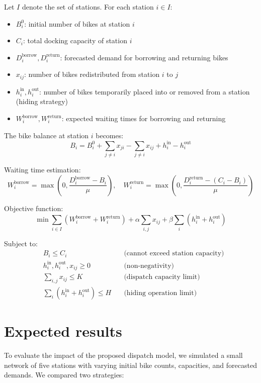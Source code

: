\documentclass[11pt,a4paper]{article}
\begin{document}
Let $I$ denote the set of stations. For each station $i \in I$:

\begin{itemize}
    \item $B_i^0$: initial number of bikes at station $i$
    \item $C_i$: total docking capacity of station $i$
    \item $D_i^{\text{borrow}}, D_i^{\text{return}}$: forecasted demand for borrowing and returning bikes
    \item $x_{ij}$: number of bikes redistributed from station $i$ to $j$
    \item $h_i^{\text{in}}, h_i^{\text{out}}$: number of bikes temporarily placed into or removed from a station (hiding strategy)
    \item $W_i^{\text{borrow}}, W_i^{\text{return}}$: expected waiting times for borrowing and returning
\end{itemize}

The bike balance at station $i$ becomes:
\[
B_i = B_i^0 + \sum_{j \ne i} x_{ji} - \sum_{j \ne i} x_{ij} + h_i^{\text{in}} - h_i^{\text{out}}
\]

Waiting time estimation:
\[
W_i^{\text{borrow}} = \max\left(0, \frac{D_i^{\text{borrow}} - B_i}{\mu}\right), \quad
W_i^{\text{return}} = \max\left(0, \frac{D_i^{\text{return}} - (C_i - B_i)}{\mu}\right)
\]

Objective function:
\[
\min \sum_{i \in I} \left( W_i^{\text{borrow}} + W_i^{\text{return}} \right) + \alpha \sum_{i,j} x_{ij} + \beta \sum_{i} \left( h_i^{\text{in}} + h_i^{\text{out}} \right)
\]

Subject to:
\begin{align*}
& B_i \leq C_i \quad &\text{(cannot exceed station capacity)} \\
& h_i^{\text{in}}, h_i^{\text{out}}, x_{ij} \geq 0 \quad &\text{(non-negativity)} \\
& \sum_{i,j} x_{ij} \leq K \quad &\text{(dispatch capacity limit)} \\
& \sum_i (h_i^{\text{in}} + h_i^{\text{out}}) \leq H \quad &\text{(hiding operation limit)}
\end{align*}

\section{Expected results}

To evaluate the impact of the proposed dispatch model, we simulated a small network of five stations with varying initial bike counts, capacities, and forecasted demands. We compared two strategies:
\end{document}
